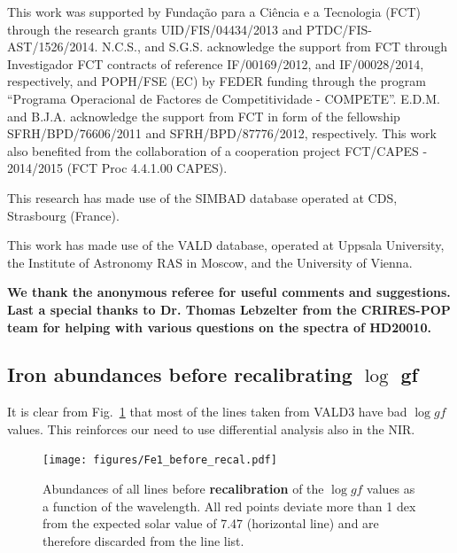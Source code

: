 \documentclass{aa}
\begin{document}
\begin{acknowledgements}

This work was supported by Funda\c{c}\~ao para a Ci\^encia e a
Tecnologia (FCT) through the research grants UID/FIS/04434/2013 and
PTDC/FIS-AST/1526/2014. N.C.S., and S.G.S. acknowledge the support from
FCT through Investigador FCT contracts of reference IF/00169/2012, and
IF/00028/2014, respectively, and POPH/FSE (EC) by FEDER funding through
the program “Programa Operacional de Factores de Competitividade
- COMPETE”. E.D.M. and B.J.A. acknowledge the support from FCT in
form of the fellowship SFRH/BPD/76606/2011 and SFRH/BPD/87776/2012,
respectively. This work also benefited from the collaboration of a
cooperation project FCT/CAPES - 2014/2015 (FCT Proc 4.4.1.00 CAPES).

This research has made use of the SIMBAD database operated at CDS,
Strasbourg (France).

This work has made use of the VALD database, operated at Uppsala
University, the Institute of Astronomy RAS in Moscow, and the University
of Vienna.

\textbf{We thank the anonymous referee for useful comments and suggestions.
Last a special thanks to Dr. Thomas Lebzelter from the CRIRES-POP
team for helping with various questions on the spectra of HD20010.}

\end{acknowledgements}






\begin{appendix}
\section{Iron abundances before recalibrating $\log$ gf}
\label{sec:section label}

It is clear from Fig.~\ref{fig:fe1_before_recal} that most of the lines taken
from VALD3 have bad $\log\mathit{gf}$ values. This reinforces our need to
use differential analysis also in the NIR.

\begin{figure}[tbp!]
    \centering
    \texttt{[image: figures/Fe1\_before\_recal.pdf]}
    \caption{Abundances of all  lines before
    \textbf{recalibration} of the $\log\mathit{gf}$ values as a function of the wavelength.
    All red points deviate more than 1 dex from the expected solar value of
    7.47 (horizontal line) and are therefore discarded from the line list.}
    \label{fig:fe1_before_recal}
\end{figure}


\end{appendix}
\end{document}
